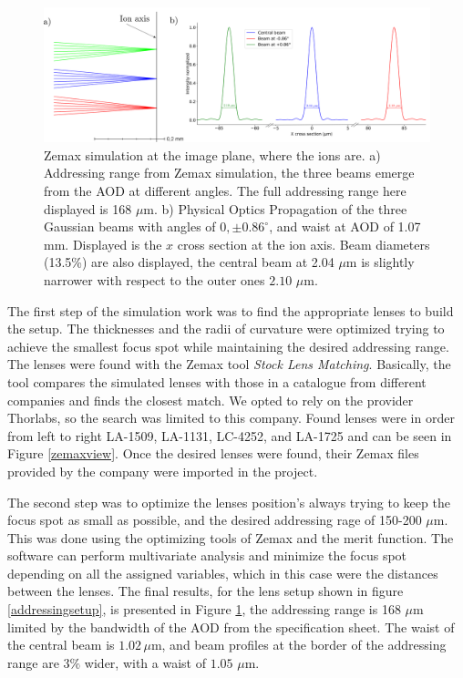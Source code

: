 \begin{figure}
     \centering
     \centering
     \includegraphics[width=1\textwidth]{img/range_plus_3beams}
     \caption{Zemax simulation at the image plane, where the ions are. a) Addressing range from Zemax simulation, the three beams emerge from the AOD at different angles. The full addressing range here displayed is 168 $\mu$m. b) Physical Optics Propagation of the three Gaussian beams with angles of $0,\pm0.86^\circ$, and waist at AOD of 1.07 mm. Displayed is the $x$ cross section at the ion axis. Beam diameters (13.5\%) are also displayed, the central beam at 2.04 $\mu$m is slightly narrower with respect to the outer ones $2.10$ $\mu$m.}
     \label{zemaxrange}
\end{figure}
The first step of the simulation work was to find the appropriate lenses to build the setup. The thicknesses and the radii of curvature were optimized trying to achieve the smallest focus spot while maintaining the desired addressing range. The lenses were found with the Zemax tool \emph{Stock Lens Matching}. Basically, the tool compares the simulated lenses with those in a catalogue from different companies and finds the closest match. We opted to rely on the provider Thorlabs, so the search was limited to this company. Found lenses were in order from left to right LA-1509, LA-1131, LC-4252, and LA-1725 and can be seen in Figure \ref{zemaxview}. Once the desired lenses were found, their Zemax files provided by the company were imported in the project.\par
The second step was to optimize the lenses position's always trying to keep the focus spot as small as possible, and the desired addressing rage of 150-200 $\mu$m. This was done using the optimizing tools of Zemax and the merit function. The software can perform multivariate analysis and minimize the focus spot depending on all the assigned variables, which in this case were the distances between the lenses. The final results, for the lens setup shown in figure \ref{addressingsetup}, is presented in Figure \ref{zemaxrange}, the addressing range is 168 $\mu$m limited by the bandwidth of the AOD from the specification sheet. The waist of the central beam is $1.02\,\mu$m, and beam profiles at the border of the addressing range are $3\%$ wider, with a waist of $1.05$ $\mu$m.\par
